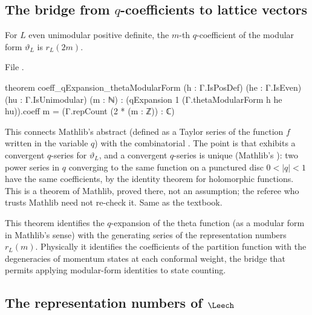 \subsection{\texorpdfstring{The bridge from $q$-coefficients to lattice vectors}{The bridge from q-coefficients to lattice vectors}}

\begin{theorem}\label{ch02:thm:bridgeq}
For $L$ even unimodular positive definite, the $m$-th $q$-coefficient of the modular form
$\vartheta_L$ is $r_L(2m)$.
\end{theorem}
\noindent File .
\begin{leancode}
theorem coeff_qExpansion_thetaModularForm (h : Γ.IsPosDef) (he : Γ.IsEven) (hu : Γ.IsUnimodular)
    (m : ℕ) :
    (qExpansion 1 (Γ.thetaModularForm h he hu)).coeff m = (Γ.repCount (2 * (m : ℤ)) : ℂ)
\end{leancode}
\begin{dictionary}
This connects Mathlib's abstract  (defined as a Taylor series of the function
$f$ written in the variable $q$) with the combinatorial .  The point is that
 exhibits a convergent $q$-series for $\vartheta_L$, and a convergent
$q$-series is unique (Mathlib's ): two power
series in $q$ converging to the same function on a punctured disc $0<|q|<1$ have the same
coefficients, by the identity theorem for holomorphic functions.  This is a theorem of Mathlib,
proved there, not an assumption; the referee who trusts Mathlib need not re-check it.  Same as
the textbook.
\end{dictionary}
\begin{physics}
This theorem identifies the $q$-expansion of the theta function (as a modular form in Mathlib's sense) with the generating series of the representation numbers $r_L(m)$. Physically it identifies the coefficients of the partition function with the degeneracies of momentum states at each conformal weight, the bridge that permits applying modular-form identities to state counting.
\end{physics}

\subsection{\texorpdfstring{The representation numbers of $\Leech$}{The representation numbers of the Leech lattice}}\label{ch02:sec:repcounts}

